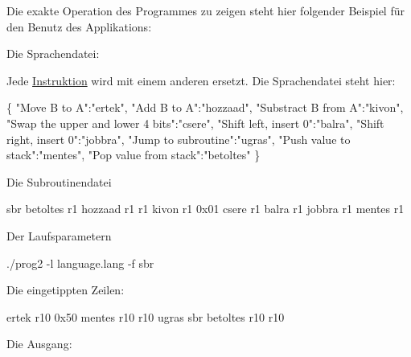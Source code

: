 Die exakte Operation des Programmes zu zeigen steht hier folgender Beispiel für den Benutz des Applikations\+:
\begin{DoxyEnumerate}
\item Die Sprachendatei\+:

Jede \mbox{\hyperlink{class_instruktion}{Instruktion}} wird mit einem anderen ersetzt. Die Sprachendatei steht hier\+: 
\begin{DoxyCode}
\{
    "Move B to A":"ertek",
    "Add B to A":"hozzaad",
    "Substract B from A":"kivon",
    "Swap the upper and lower 4 bits":"csere",
    "Shift left, insert 0":"balra",
    "Shift right, insert 0":"jobbra",
    "Jump to subroutine":"ugras",
    "Push value to stack":"mentes",
    "Pop value from stack":"betoltes"
\}
\end{DoxyCode}

\item Die Subroutinendatei 
\begin{DoxyCode}
sbr
betoltes r1
hozzaad r1 r1
kivon r1 0x01
csere r1
balra r1
jobbra r1
mentes r1
\end{DoxyCode}

\item Der Laufsparametern

{\ttfamily ./prog2 -\/l language.\+lang -\/f sbr}
\item Die eingetippten Zeilen\+: 
\begin{DoxyCode}
ertek r10 0x50
mentes r10
r10
ugras sbr
betoltes r10
r10
\end{DoxyCode}

\item Die Ausgang\+: 
 
\end{DoxyEnumerate}